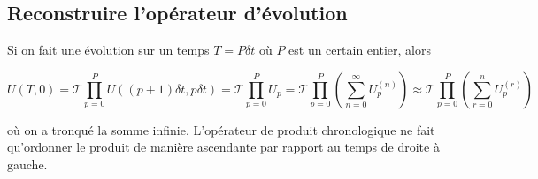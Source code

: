 \subsection{Reconstruire l'opérateur d'évolution}
Si on fait une évolution sur un temps $T = P\delta t$ où $P$ est un certain entier, alors 

\begin{equation*}
    U(T,0) = \mathcal{T}\prod_{p=0}^{P}U((p+1)\delta t, p\delta t) = \mathcal{T}\prod_{p=0}^{P} U_p = \mathcal{T}\prod_{p=0}^{P}\left(\sum_{n=0}^{\infty}U_p^{(n)}\right) \approx  \mathcal{T}\prod_{p=0}^{P}\left(\sum_{r=0}^{n}U_p^{(r)}\right)
\end{equation*}

où on a tronqué la somme infinie. L'opérateur de produit chronologique ne fait qu'ordonner le produit de manière ascendante par rapport au temps de droite à gauche.






